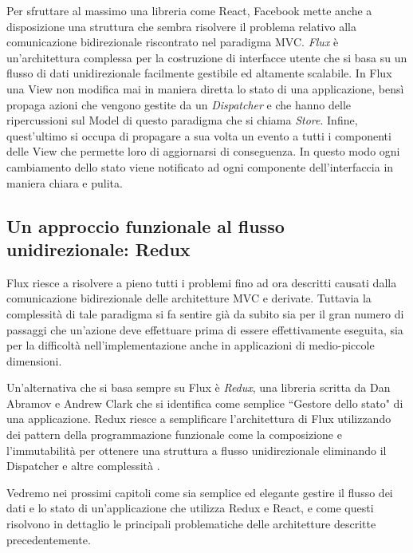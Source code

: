 Per sfruttare al massimo una libreria come React, Facebook mette anche a disposizione una struttura che sembra risolvere il problema relativo alla comunicazione bidirezionale riscontrato nel paradigma MVC. \textit{Flux} è un'architettura complessa per la costruzione di interfacce utente che si basa su un flusso di dati unidirezionale facilmente gestibile ed altamente scalabile. In Flux una View non modifica mai in maniera diretta lo stato di una applicazione, bensì propaga azioni che vengono gestite da un \textit{Dispatcher} e che hanno delle ripercussioni sul Model di questo paradigma che si chiama \textit{Store}. Infine, quest'ultimo si occupa di propagare a sua volta un evento a tutti i componenti delle View che permette loro di aggiornarsi di conseguenza. In questo modo ogni cambiamento dello stato viene notificato ad ogni componente dell'interfaccia in maniera chiara e pulita.

\subsection{Un approccio funzionale al flusso unidirezionale: Redux}
Flux riesce a risolvere a pieno tutti i problemi fino ad ora descritti causati dalla comunicazione bidirezionale delle architetture MVC e derivate. Tuttavia la complessità di tale paradigma si fa sentire già da subito sia per il gran numero di passaggi che un'azione deve effettuare prima di essere effettivamente eseguita, sia per la difficoltà nell'implementazione anche in applicazioni di medio-piccole dimensioni.

Un'alternativa che si basa sempre su Flux è \textit{Redux}, una libreria scritta da Dan Abramov e Andrew Clark che si identifica come semplice “Gestore dello stato" di una applicazione. Redux riesce a semplificare l'architettura di Flux utilizzando dei pattern della programmazione funzionale come la composizione e l'immutabilità per ottenere una struttura a flusso unidirezionale eliminando il Dispatcher e altre complessità \cite{AbramovOnReduxVsFlux}.

Vedremo nei prossimi capitoli come sia semplice ed elegante gestire il flusso dei dati e lo stato di un'applicazione che utilizza Redux e React, e come questi risolvono in dettaglio le principali problematiche delle architetture descritte precedentemente.